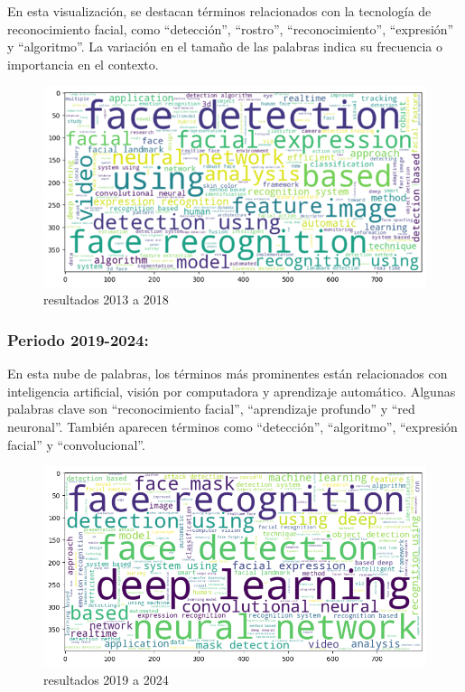 \documentclass[conference]{IEEEtran}
\begin{document}
En esta visualización, se destacan términos relacionados con la tecnología de reconocimiento facial, como “detección”, “rostro”, “reconocimiento”, “expresión” y “algoritmo”. La variación en el tamaño de las palabras indica su frecuencia o importancia en el contexto.
\begin{figure}[H]
    \centering
\includegraphics[width=1\linewidth]{nube2013.png}
    \caption{resultados 2013 a 2018}
    \label{fig:enter-label}
\end{figure}

\subsubsection{Periodo 2019-2024:}
En esta nube de palabras, los términos más prominentes están relacionados con inteligencia artificial, visión por computadora y aprendizaje automático. Algunas palabras clave son “reconocimiento facial”, “aprendizaje profundo” y “red neuronal”. También aparecen términos como “detección”, “algoritmo”, “expresión facial” y “convolucional”.
\begin{figure}[H]
    \centering
\includegraphics[width=1\linewidth]{nube2019.png}
    \caption{resultados 2019 a 2024}
    \label{fig:enter-label}
\end{figure}
\end{document}
